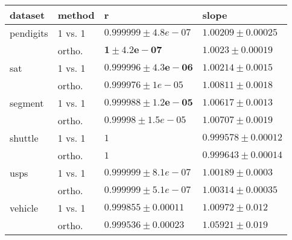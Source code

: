 \begin{tabular}{|ll|ll|}
\hline
dataset   & method  & r & slope \\\hline\hline
pendigits & 1 vs. 1 & $    0.999999\pm  4.8e-07$ & $\mathbf{1.00209\pm  0.00025}$ \\
          & ortho.  & $\mathbf{1\pm  4.2e-07}$ & $      1.0023\pm  0.00019$\\\hline
sat       & 1 vs. 1 & $\mathbf{0.999996\pm4.3e-06}$ & $\mathbf{1.00214\pm   0.0015}$ \\
          & ortho.  & $    0.999976\pm    1e-05$ & $     1.00811\pm   0.0018$\\\hline
segment   & 1 vs. 1 & $\mathbf{  0.999988\pm  1.2e-05}$ & $\mathbf{1.00617\pm0.0013}$ \\
          & ortho.  & $     0.99998\pm  1.5e-05$ & $     1.00707\pm   0.0019$\\\hline
shuttle   & 1 vs. 1 & $           1$ & $    0.999578\pm  0.00012$ \\
          & ortho.  & $           1$ & $\mathbf{0.999643\pm  0.00014}$\\\hline
usps      & 1 vs. 1 & $    0.999999\pm  8.1e-07$ & $\mathbf{1.00189\pm0.0003}$ \\
          & ortho.  & $    0.999999\pm  5.1e-07$ & $     1.00314\pm  0.00035$\\\hline
vehicle   & 1 vs. 1 & $\mathbf{0.999855\pm0.00011}$ & $\mathbf{1.00972\pm    0.012}$ \\
          & ortho.  & $    0.999536\pm  0.00023$ & $     1.05921\pm    0.019$\\\hline
\end{tabular}
